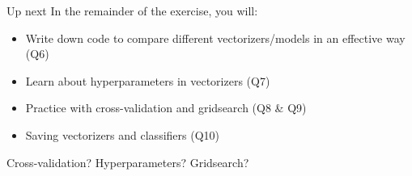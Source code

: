 \documentclass[handout]{beamer}
\begin{document}
\begin{frame}{Up next}
In the remainder of the exercise, you will:
\begin{itemize}
\item Write down code to compare different vectorizers/models in an effective way (Q6)
		\item Learn about hyperparameters in vectorizers (Q7)
		\item Practice with cross-validation and gridsearch (Q8 \& Q9)
		\item Saving vectorizers and classifiers (Q10) 
\end{itemize}

Cross-validation? Hyperparameters? Gridsearch?
\end{frame}



	
	
	
	
	
	


	
	
\end{document}
